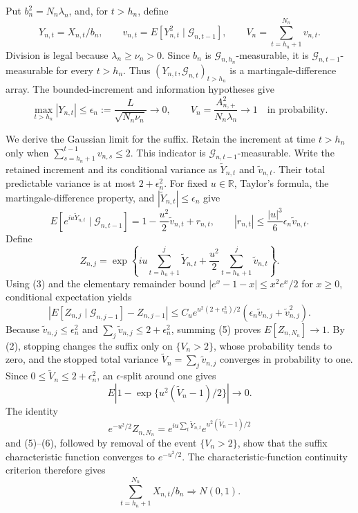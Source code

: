 Put \(b_n^2=N_n\lambda_n\), and, for \(t>h_n\), define
\[
 Y_{n,t}=X_{n,t}/b_n,\qquad
 v_{n,t}=E[Y_{n,t}^2\mid\mathcal G_{n,t-1}],\qquad
 V_n=\sum_{t=h_n+1}^{N_n}v_{n,t}.
\tag{1}
\]
Division is legal because \(\lambda_n\ge\nu_n>0\). Since \(b_n\) is \(\mathcal G_{n,h_n}\)-measurable, it is \(\mathcal G_{n,t-1}\)-measurable for every \(t>h_n\). Thus \((Y_{n,t},\mathcal G_{n,t})_{t>h_n}\) is a martingale-difference array. The bounded-increment and information hypotheses give
\[
 \max_{t>h_n}|Y_{n,t}|\le
 \epsilon_n:=\frac{L}{\sqrt{N_n\nu_n}}\longrightarrow0,
 \qquad
 V_n=\frac{A_{n,+}^2}{N_n\lambda_n}\longrightarrow1
 \quad\text{in probability}.
\tag{2}
\]

We derive the Gaussian limit for the suffix. Retain the increment at time \(t>h_n\) only when \(\sum_{s=h_n+1}^{t-1}v_{n,s}\le2\). This indicator is \(\mathcal G_{n,t-1}\)-measurable. Write the retained increment and its conditional variance as \(\widetilde Y_{n,t}\) and \(\widetilde v_{n,t}\). Their total predictable variance is at most \(2+\epsilon_n^2\). For fixed \(u\in\mathbb R\), Taylor's formula, the martingale-difference property, and \(|\widetilde Y_{n,t}|\le\epsilon_n\) give
\[
 E[e^{iu\widetilde Y_{n,t}}\mid\mathcal G_{n,t-1}]
 =1-\frac{u^2}{2}\widetilde v_{n,t}+r_{n,t},
 \qquad
 |r_{n,t}|\le\frac{|u|^3}{6}\epsilon_n\widetilde v_{n,t}.
\tag{3}
\]
Define
\[
 Z_{n,j}=\exp\left\{iu\sum_{t=h_n+1}^j\widetilde Y_{n,t}
 +\frac{u^2}{2}\sum_{t=h_n+1}^j\widetilde v_{n,t}\right\}.
\tag{4}
\]
Using (3) and the elementary remainder bound \(|e^x-1-x|\le x^2e^x/2\) for \(x\ge0\), conditional expectation yields
\[
 \left|E[Z_{n,j}\mid\mathcal G_{n,j-1}]-Z_{n,j-1}\right|
 \le C_u e^{u^2(2+\epsilon_n^2)/2}
 \left(\epsilon_n\widetilde v_{n,j}+\widetilde v_{n,j}^2\right).
\tag{5}
\]
Because \(\widetilde v_{n,j}\le\epsilon_n^2\) and \(\sum_j\widetilde v_{n,j}\le2+\epsilon_n^2\), summing (5) proves \(E[Z_{n,N_n}]\to1\). By (2), stopping changes the suffix only on \(\{V_n>2\}\), whose probability tends to zero, and the stopped total variance \(\widetilde V_n=\sum_j\widetilde v_{n,j}\) converges in probability to one. Since \(0\le\widetilde V_n\le2+\epsilon_n^2\), an \(\epsilon\)-split around one gives
\[
 E\left|1-\exp\{u^2(\widetilde V_n-1)/2\}\right|\longrightarrow0.
\tag{6}
\]
The identity
\[
 e^{-u^2/2}Z_{n,N_n}
 =e^{iu\sum_t\widetilde Y_{n,t}}
 e^{u^2(\widetilde V_n-1)/2}
\]
and (5)--(6), followed by removal of the event \(\{V_n>2\}\), show that the suffix characteristic function converges to \(e^{-u^2/2}\). The characteristic-function continuity criterion therefore gives
\[
 \sum_{t=h_n+1}^{N_n}X_{n,t}/b_n\Rightarrow N(0,1).
\tag{7}
\]

